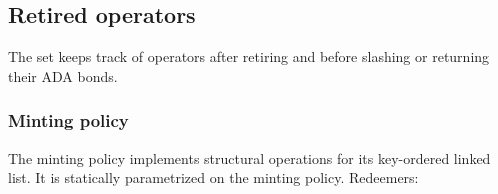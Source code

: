 \documentclass[../midgard.tex]{subfiles}
\begin{document}
\subsection{Retired operators}
\label{h:retired-operators}

The  set keeps track of operators after retiring and before slashing or returning their ADA bonds.

\subsubsection{Minting policy}
\label{h:retired-operators-minting-policy}

The  minting policy implements structural operations for its key-ordered linked list.
It is statically parametrized on the  minting policy.
Redeemers:
\end{document}
